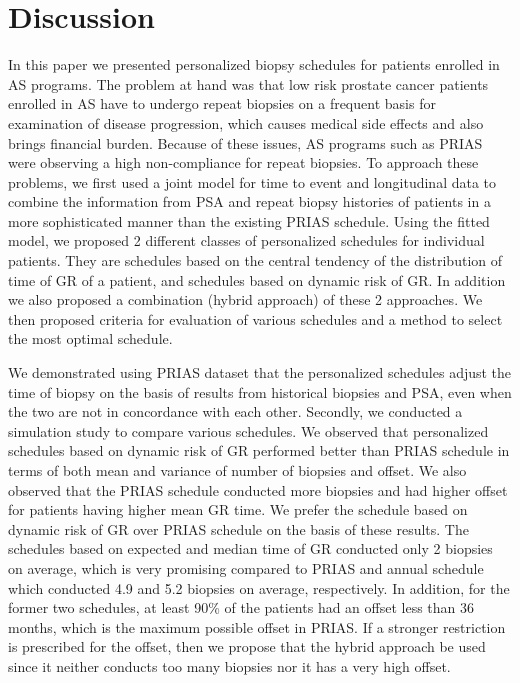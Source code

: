 
\section{Discussion}
\label{sec: discussion}
In this paper we presented personalized biopsy schedules for patients enrolled in AS programs. The problem at hand was that low risk prostate cancer patients enrolled in AS have to undergo repeat biopsies on a frequent basis for examination of disease progression, which causes medical side effects and also brings financial burden. Because of these issues, AS programs such as PRIAS were observing a high non-compliance for repeat biopsies. To approach these problems, we first used a joint model for time to event and longitudinal data to combine the information from PSA and repeat biopsy histories of patients in a more sophisticated manner than the existing PRIAS schedule. Using the fitted model, we proposed 2 different classes of personalized schedules for individual patients. They are schedules based on the central tendency of the distribution of time of GR of a patient, and schedules based on dynamic risk of GR. In addition we also proposed a combination (hybrid approach) of these 2 approaches. We then proposed criteria for evaluation of various schedules and a method to select the most optimal schedule.

We demonstrated using PRIAS dataset that the personalized schedules adjust the time of biopsy on the basis of results from historical biopsies and PSA, even when the two are not in concordance with each other. Secondly, we conducted a simulation study to compare various schedules. We observed that personalized schedules based on dynamic risk of GR performed better than PRIAS schedule in terms of both mean and variance of number of biopsies and offset. We also observed that the PRIAS schedule conducted more biopsies and had higher offset for patients having higher mean GR time. We prefer the schedule based on dynamic risk of GR over PRIAS schedule on the basis of these results. The schedules based on expected and median time of GR conducted only 2 biopsies on average, which is very promising compared to PRIAS and annual schedule which conducted 4.9 and 5.2 biopsies on average, respectively. In addition, for the former two schedules, at least 90\% of the patients had an offset less than 36 months, which is the maximum possible offset in PRIAS. If a stronger restriction is prescribed for the offset, then we propose that the hybrid approach be used since it neither conducts too many biopsies nor it has a very high offset.

